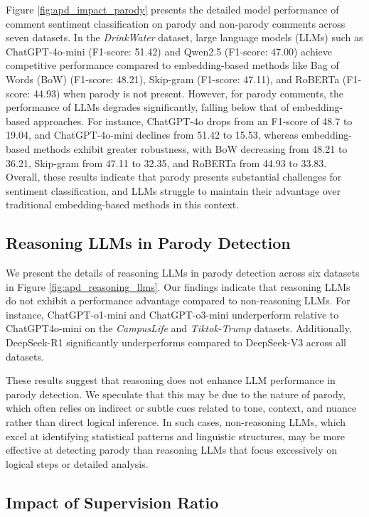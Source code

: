 Figure \ref{fig:apd_impact_parody} presents the detailed model performance of comment sentiment classification on parody and non-parody comments across seven datasets. In the \textit{DrinkWater} dataset, large language models (LLMs) such as ChatGPT-4o-mini (F1-score: 51.42) and Qwen2.5 (F1-score: 47.00) achieve competitive performance compared to embedding-based methods like Bag of Words (BoW) (F1-score: 48.21), Skip-gram (F1-score: 47.11), and RoBERTa (F1-score: 44.93) when parody is not present. However, for parody comments, the performance of LLMs degrades significantly, falling below that of embedding-based approaches. For instance, ChatGPT-4o drops from an F1-score of 48.7 to 19.04, and ChatGPT-4o-mini declines from 51.42 to 15.53, whereas embedding-based methods exhibit greater robustness, with BoW decreasing from 48.21 to 36.21, Skip-gram from 47.11 to 32.35, and RoBERTa from 44.93 to 33.83. Overall, these results indicate that parody presents substantial challenges for sentiment classification, and LLMs struggle to maintain their advantage over traditional embedding-based methods in this context.

\subsection{Reasoning LLMs in Parody Detection}\label{apd:reasoning_llms}


We present the details of reasoning LLMs in parody detection across six datasets in Figure \ref{fig:apd_reasoning_llms}. Our findings indicate that reasoning LLMs do not exhibit a performance advantage compared to non-reasoning LLMs. For instance, ChatGPT-o1-mini and ChatGPT-o3-mini underperform relative to ChatGPT4o-mini on the \textit{CampusLife} and \textit{Tiktok-Trump} datasets. Additionally, DeepSeek-R1 significantly underperforms compared to DeepSeek-V3 across all datasets. 

These results suggest that reasoning does not enhance LLM performance in parody detection. We speculate that this may be due to the nature of parody, which often relies on indirect or subtle cues related to tone, context, and nuance rather than direct logical inference. In such cases, non-reasoning LLMs, which excel at identifying statistical patterns and linguistic structures, may be more effective at detecting parody than reasoning LLMs that focus excessively on logical steps or detailed analysis.

\subsection{Impact of Supervision Ratio}\label{apd:train_ratio}

